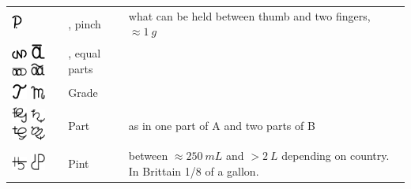 \documentclass[british,final,landscape]{scrartcl}
\begin{document}
\begin{refsection}
\begin{supertabular}{p{0.3\textwidth}p{0.34\textwidth}p{0.34\textwidth}}
   \includegraphics[height=5mm]{Measures/Pugil} & , pinch & what can be held between thumb and two fingers, \(\approx \SI{1}{g}\)\\
   \includegraphics[width=5mm]{Measures/EqualParts} \includegraphics[width=5mm]{Measures/EqualParts2} \includegraphics[width=5mm]{Measures/EqualParts3} \includegraphics[width=5mm]{Measures/EqualParts4} & , equal parts  & \\
   \includegraphics[width=5mm]{Measures/Grade} \includegraphics[width=5mm]{Measures/Grade2} & Grade & \\
   \includegraphics[width=5mm]{Measures/Part} \includegraphics[width=5mm]{Measures/Part2} \includegraphics[width=5mm]{Measures/Part3} \includegraphics[width=5mm]{Measures/Part4} & Part & as in one part of A and two parts of B\\
   \includegraphics[width=5mm]{Measures/Pint} \includegraphics[width=5mm]{Measures/Pint2} & Pint & between \(\approx \SI{250}{mL}\) and \(> \SI{2}{L}\) depending on country. In Brittain 1/8 of a gallon. \\

\end{supertabular}
\end{refsection}
\end{document}
